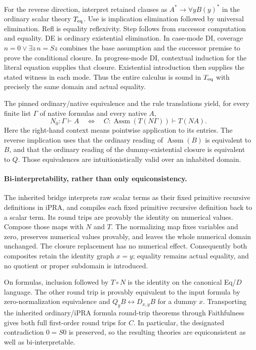 For the reverse direction, interpret retained clauses as
$A^*\to\forall yB(y)^*$ in the ordinary scalar theory $T_{\rm eq}$.
Use is implication elimination followed by universal elimination.
Refl is equality reflexivity. Step follows from successor computation
and equality. DE is ordinary existential elimination. In case-mode DI,
coverage $n=0\lor\exists z\,n=Sz$ combines the base assumption and
the successor premise to prove the conditional closure. In progress-mode
DI, contextual induction for the literal equation supplies that closure.
Existential introduction then supplies the stated witness in each mode.
Thus the entire calculus is sound in $T_{\rm eq}$ with precisely the
same domain and actual equality.

The pinned ordinary/native equivalence and the rule translations yield,
for every finite list $\Gamma$ of native formulas and every native $A$,
\[
 N_0:\Gamma\vdash A
 \quad\Longleftrightarrow\quad
 C:\operatorname{Assm}(T(N\Gamma))\vdash T(NA).
 \tag{Faithfulness}
\]
Here the right-hand context means pointwise application to its entries.
The reverse implication uses that the ordinary reading of
$\operatorname{Assm}(B)$ is equivalent to $B$, and that the ordinary
reading of the dummy-existential closure is equivalent to $Q$.
Those equivalences are intuitionistically valid over an inhabited domain.

\paragraph{Bi-interpretability, rather than only equiconsistency.}
The inherited bridge interprets raw scalar terms as their fixed primitive
recursive definitions in iPRA, and compiles each fixed primitive recursive
definition back to a scalar term. Its round trips are provably the identity
on numerical values. Compose those maps with $N$ and $T$. The normalizing
map fixes variables and zero, preserves numerical values provably, and
leaves the whole numerical domain unchanged. The closure replacement has
no numerical effect. Consequently both composites retain the identity
graph $x=y$; equality remains actual equality, and no quotient or proper
subdomain is introduced.

On formulas, inclusion followed by $T\circ N$ is the identity on the
canonical Eq/$D$ language. The other round trip is provably equivalent
to the input formula by zero-normalization equivalence and
$Q_yB\leftrightarrow D_{x,y}B$ for a dummy $x$. Transporting the inherited
ordinary/iPRA formula round-trip theorems through Faithfulness gives both
full first-order round trips for $C$. In particular, the designated
contradiction $0=S0$ is preserved, so the resulting theories are
equiconsistent as well as bi-interpretable.

